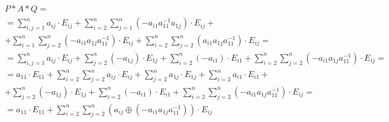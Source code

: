 \documentclass[mat1]{fmfdelo}
\begin{document}
\begin{dokaz}
	\begin{align*}
		& P*A*Q = \\
		&= \sum_{i, j = 1}^{n}a_{ij}\cdot E_{ij} + \sum_{i = 2}^{n}\sum_{j = 1}^{n} (-a_{i1}a_{11}^{-1}a_{1j})\cdot E_{ij} + \\
		&+ \sum_{i = 1}^{n}\sum_{j = 2}^{n} (-a_{i1}a_{1j}a_{11}^{-1})\cdot E_{ij} +  \sum_{i = 2}^{n}\sum_{j=2}^{n} (a_{i1}a_{1j}a_{11}^{-1})\cdot E_{ij} = \\
		&= \sum_{i, j = 1}^{n}a_{ij}\cdot E_{ij} + \sum_{j = 2}^{n}(-a_{1j})\cdot E_{1j} + \sum_{i = 2}^{n}(-a_{i1})\cdot E_{i1} + \sum_{i = 2}^{n}\sum_{j=2}^{n} (-a_{i1}a_{1j}a_{11}^{-1})\cdot E_{ij} = \\
		&= a_{11}\cdot E_{11} + \sum_{i = 2}^{n} \sum_{j = 2}^{n} a_{ij}\cdot E_{ij} + \sum_{j = 2}^{n} a_{1j}\cdot E_{1j} + \sum_{i = 2}^{n} a_{i1}\cdot E_{i1} + \\
		&+ \sum_{j = 2}^{n} (-a_{1j})\cdot E_{1j} + \sum_{i = 2}^{n} (-a_{i1})\cdot E_{i1} + \sum_{i = 2}^{n} \sum_{j = 2}^{n} (-a_{i1}a_{1j}a_{11}^{-1})\cdot E_{ij} = \\
		&= a_{11}\cdot E_{11} + \sum_{i = 2}^{n} \sum_{j = 2}^{n} (a_{ij} \oplus (-a_{i1}a_{1j}a_{11}^{-1}))\cdot E_{ij}
	\end{align*}


\end{dokaz}
\end{document}
